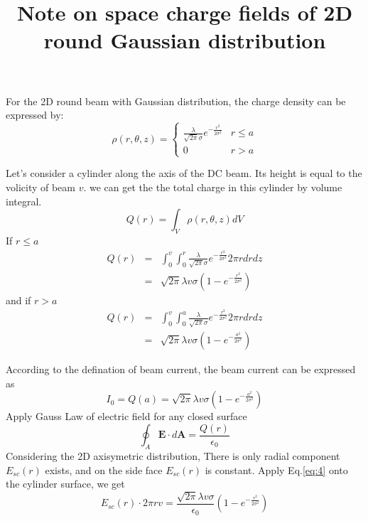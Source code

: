 \documentclass[aps,prstab,twocolumn,superscriptaddress,showpacs]{revtex4}
\newcommand{\bs}[1]{\mathbf #1}
\begin{document}
\title{Note on space charge fields of 2D round Gaussian distribution}

\maketitle

For the 2D round beam with Gaussian distribution, the charge density can be expressed by:
\begin{equation}\label{eq:1}
  \rho(r,\theta, z)=\left\{
  \begin{array}{ll}
    \frac{\lambda}{\sqrt{2\pi}\sigma}e^{-\frac{r^2}{2\sigma^2}} & r \le a \\
    0 & r > a
  \end {array}
  \right.
\end{equation}  

Let's consider a cylinder along the axis of the DC beam. Its height is equal to the volicity of beam $v$.
we can get the the total charge in this cylinder by volume integral. 
\begin{equation}\label{eq:11}
  Q(r)  =  \int_V\rho(r,\theta, z)dV \nonumber
\end{equation}  
If $r \le a$
\begin{eqnarray}\label{eq:12}
  Q(r) & = & \int_0^v\int_0^r \frac{\lambda}{\sqrt{2\pi}\sigma}e^{-\frac{r^2}{2\sigma^2}} 2\pi r drdz \nonumber \\ 
  & = & \sqrt{2\pi}\lambda v\sigma\left(1-e^{{-\frac{r^2}{2\sigma^2}}}\right) 
\end{eqnarray}
and if $r > a$
\begin{eqnarray}\label{eq:13}
  Q(r) & = & \int_0^v\int_0^a \frac{\lambda}{\sqrt{2\pi}\sigma}e^{-\frac{r^2}{2\sigma^2}} 2\pi r drdz \nonumber \\ 
  & = & \sqrt{2\pi}\lambda v\sigma\left(1-e^{{-\frac{a^2}{2\sigma^2}}}\right) 
\end{eqnarray}

According to the defination of beam current, the beam current can be expressed as 
\begin{equation}\label{eq:3}
I_0 = Q(a) = \sqrt{2\pi}\lambda v\sigma \left(1-e^{{-\frac{a^2}{2\sigma^2}}}\right)
\end{equation}
Apply Gauss Law of electric field for any closed surface 
\begin{equation}\label{eq:4}
  \oint_A \bs{E}\cdot d\bs{A} = \frac{Q(r)}{\epsilon_0}
\end{equation}
Considering the 2D axisymetric distribution, There is only radial component $E_{sc}(r)$ exists, and on the side face $E_{sc}(r)$ is constant.
Apply Eq.{\ref{eq:4}} onto the cylinder surface, we get
\begin{equation}\label{eq:5}
  E_{sc}(r)\cdot 2\pi r v = \frac{\sqrt{2\pi}\lambda v\sigma}{\epsilon_0}\left(1-e^{{-\frac{r^2}{2\sigma^2}}}\right)
\end{equation}
\end{document}
